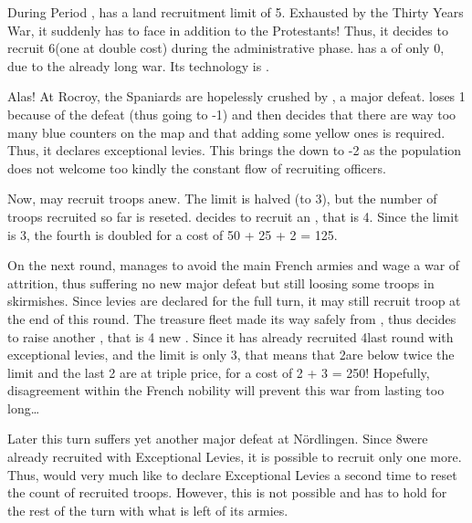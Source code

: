 \begin{exemple}
  During Period , \HIS has a land recruitment limit of
  5\LD. Exhausted by the Thirty Years War, it suddenly has to face \FRA in
  addition to the Protestants! Thus, it decides to recruit 6\LD (one at double
  cost) during the administrative phase. \HIS has a \STAB of only 0, due to
  the already long war. Its technology is \TBAR.

  Alas! At Rocroy, the Spaniards are hopelessly crushed by , a major defeat. \HIS loses 1 \STAB because of the defeat (thus
  going to -1) and then decides that there are way too many blue counters on
  the map and that adding some yellow ones is required. Thus, it declares
  exceptional levies. This brings the \STAB down to -2 as the population does
  not welcome too kindly the constant flow of recruiting officers.

  Now, \HIS may recruit troops anew. The limit is halved (to 3\LD), but the
  number of troops recruited so far is reseted. \HIS decides to recruit an
  \ARMY\Faceplus, that is 4\LD. Since the limit is 3\LD, the fourth is doubled
  for a cost of 50 + 25 + 2  = 125\ducats.

  \smallskip

  On the next round, \HIS manages to avoid the main French armies and wage a
  war of attrition, thus suffering no new major defeat but still loosing some
  troops in skirmishes. Since levies are declared for the full turn, it may
  still recruit troop at the end of this round. The treasure fleet made its
  way safely from \continentAmerica, thus \HIS decides to raise another
  \ARMY\Faceplus, that is 4 new \LD. Since it has already recruited 4\LD last
  round with exceptional levies, and the limit is only 3\LD, that means that
  2\LD are below twice the limit and the last 2 are at triple price, for a
  cost of 2  + 3  = 250\ducats! Hopefully,
  disagreement within the French nobility will prevent this war from lasting
  too long\ldots

  \smallskip

  Later this turn \HIS suffers yet another major defeat at
  N\"{o}rdlingen. Since 8\LD were already recruited with Exceptional Levies,
  it is possible to recruit only one more. Thus, \HIS would very much like to
  declare Exceptional Levies a second time to reset the count of recruited
  troops. However, this is not possible and \HIS has to hold for the rest of
  the turn with what is left of its armies.
\end{exemple}

